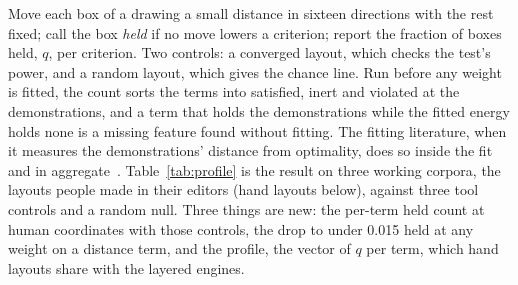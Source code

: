\documentclass[11pt]{article}
\begin{document}
Move each box of a drawing a small distance in sixteen directions with the rest fixed;
call the box \emph{held} if no move lowers a criterion; report the fraction of boxes held,
$q$, per criterion. Two controls: a converged layout, which checks the test's power, and a
random layout, which gives the chance line. Run before any weight is fitted, the count
sorts the terms into satisfied, inert and violated at the demonstrations, and a term that
holds the demonstrations while the fitted energy holds none is a missing feature found
without fitting. The fitting literature, when it measures the demonstrations' distance
from optimality, does so inside the fit and in aggregate~\cite{chan19}.
Table~\ref{tab:profile} is the result on three working corpora, the layouts people made in
their editors (hand layouts below), against three tool controls and a random null. Three things are new: the per-term held count at human coordinates with those controls,
the drop to under 0.015 held at any weight on a distance term, and the profile, the vector
of $q$ per term, which hand layouts share with the layered engines.
\end{document}
